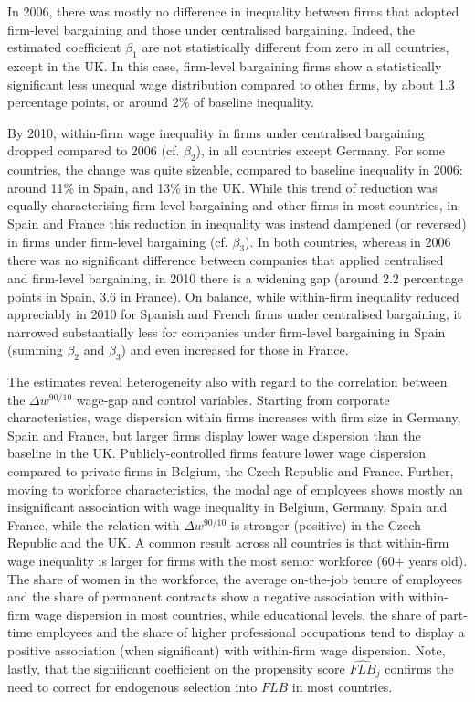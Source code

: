 \documentclass[12pt]{article}
\begin{document}
In 2006, there was mostly no difference in inequality between firms that adopted firm-level bargaining and those under centralised bargaining. Indeed, the estimated  coefficient $\beta_1$ are not statistically different from zero in all countries, except in the UK. In this case, firm-level bargaining firms show a statistically significant less unequal wage distribution compared to other firms, by about 1.3 percentage points, or around 2\% of baseline inequality.

By 2010, within-firm wage inequality in firms under centralised bargaining dropped compared to 2006 (cf. $\beta_2$), in all countries except Germany. For some countries, the change was quite sizeable, compared to baseline inequality in 2006: around 11\% in Spain, and 13\% in the UK. While this trend of reduction was equally characterising firm-level bargaining and other firms in most countries, in Spain and France this reduction in inequality was instead dampened (or reversed) in firms under firm-level bargaining (cf. $\beta_3$). In both countries, whereas in 2006 there was no significant difference between companies that applied centralised and firm-level bargaining, in 2010 there is a widening gap (around 2.2 percentage points in Spain, 3.6 in France). On balance, while within-firm inequality reduced appreciably in 2010 for Spanish and French firms under centralised bargaining, it narrowed substantially less for companies under firm-level bargaining in Spain (summing $\beta_2$ and $\beta_3$) and even increased for those in France. 

The estimates reveal heterogeneity also with regard to the correlation between the $\Delta w^{90/10}$ wage-gap and control variables. Starting from corporate characteristics, wage dispersion within firms increases with firm size in Germany, Spain and France, but larger firms display lower wage dispersion than the baseline in the UK. Publicly-controlled firms feature lower wage dispersion compared to private firms in Belgium, the Czech Republic and France. Further, moving to workforce characteristics, the modal age of employees shows mostly an insignificant association with wage inequality in Belgium, Germany, Spain and France, while the relation with $\Delta w^{90/10}$ is stronger (positive) in the Czech Republic and the UK. A common result across all countries is that within-firm wage inequality is larger for firms with the most senior workforce (60+ years old). The share of women in the workforce, the average on-the-job tenure of employees and the share of permanent contracts show a negative association with within-firm wage dispersion in most countries, while educational levels, the share of part-time employees and the share of higher professional occupations tend to display a positive association (when significant) with within-firm wage dispersion. Note, lastly, that the significant coefficient on the propensity score $\widehat{\mathit{FLB}}_j$ confirms the need to correct for endogenous selection into $\mathit{FLB}$ in most countries.
\end{document}
